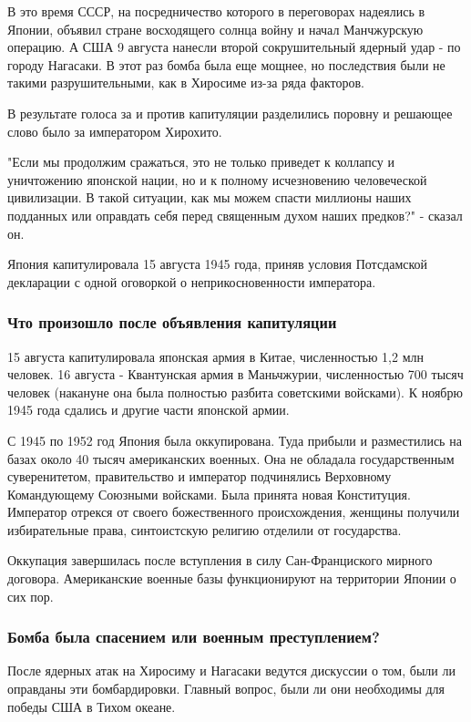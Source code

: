 \documentclass[a4paper,11pt]{extreport}
\begin{document}
В это время СССР, на посредничество которого в переговорах надеялись в Японии,
объявил стране восходящего солнца войну и начал Манчжурскую операцию. А США 9
августа нанесли второй сокрушительный ядерный удар - по городу Нагасаки. В этот
раз бомба была еще мощнее, но последствия были не такими разрушительными, как в
Хиросиме из-за ряда факторов.

В результате голоса за и против капитуляции разделились поровну и решающее слово было за императором Хирохито.

"Если мы продолжим сражаться, это не только приведет к коллапсу и уничтожению японской нации, но и к полному исчезновению человеческой цивилизации. В такой ситуации, как мы можем спасти миллионы наших подданных или оправдать себя перед священным духом наших предков?" - сказал он.

Япония капитулировала 15 августа 1945 года, приняв условия Потсдамской
декларации с одной оговоркой о неприкосновенности императора.

\subsubsection{Что произошло после объявления капитуляции}

15 августа капитулировала японская армия в Китае, численностью 1,2 млн человек.
16 августа - Квантунская армия в Маньчжурии, численностью 700 тысяч человек
(накануне она была полностью разбита советскими войсками). К ноябрю 1945 года
сдались и другие части японской армии. 

С 1945 по 1952 год Япония была оккупирована. Туда прибыли и разместились на
базах около 40 тысяч американских военных. Она не обладала государственным
суверенитетом, правительство и император подчинялись Верховному Командующему
Союзными войсками. Была принята новая Конституция. Император отрекся от своего
божественного происхождения, женщины получили избирательные права, синтоистскую
религию отделили от государства.

Оккупация завершилась после вступления в силу Сан-Франциского мирного договора.
Американские военные базы функционируют на территории Японии о сих пор.

\subsubsection{Бомба была спасением или военным преступлением?}

После ядерных атак на Хиросиму и Нагасаки ведутся дискуссии о том, были ли
оправданы эти бомбардировки. Главный вопрос, были ли они необходимы для победы
США в Тихом океане.
\end{document}
